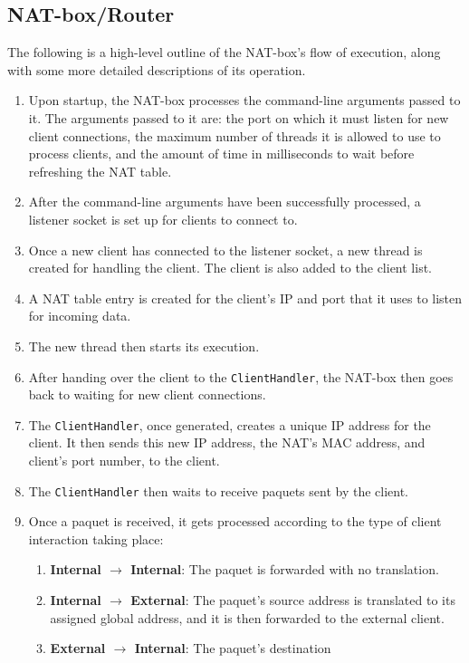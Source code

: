 \documentclass[10pt, a4paper]{article}
\begin{document}
\subsection{NAT-box/Router}
\label{ssec:natpdesc}

The following is a high-level outline of the NAT-box's flow of execution, along
with some more detailed descriptions of its operation.
\begin{enumerate}
  \item Upon startup, the NAT-box processes the command-line arguments passed to
    it. The arguments passed to it are: the port on which it must listen for new
    client connections, the maximum number of threads it is allowed to use to
    process clients, and the amount of time in milliseconds to wait before
    refreshing the NAT table.
  \item After the command-line arguments have been successfully processed, a
    listener socket is set up for clients to connect to.
  \item Once a new client has connected to the listener socket, a new thread is
    created for handling the client. The client is also added to the client
    list.
  \item A NAT table entry is created for the client's IP and port that it uses
    to listen for incoming data.
  \item The new thread then starts its execution.
  \item After handing over the client to the \texttt{ClientHandler}, the NAT-box
    then goes back to waiting for new client connections.
  \item The \texttt{ClientHandler}, once generated, creates a unique IP address
    for the client. It then sends this new IP address, the NAT's MAC address,
    and client's port number, to the client.
  \item The \texttt{ClientHandler} then waits to receive paquets sent by the
    client.
  \item Once a paquet is received, it gets processed according to the type of
    client interaction taking place:
    \begin{enumerate}
      \item \textbf{Internal $\rightarrow$ Internal}: The paquet is forwarded
        with no translation.
      \item \textbf{Internal $\rightarrow$ External}: The paquet's source
        address is translated to its assigned global address, and it is then
        forwarded to the external client.
      \item \textbf{External $\rightarrow$ Internal}: The paquet's destination

\end{enumerate}
\end{enumerate}
\end{document}

